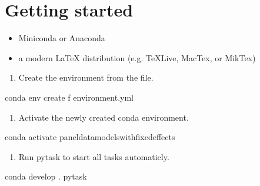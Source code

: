 \documentclass[a4paper,11pt,english]{sphinxmanual}
\begin{document}
\section{Getting started}
\label{\detokenize{introduction:getting-started}}\label{\detokenize{introduction:id3}}
\sphinxAtStartPar
{}
\begin{itemize}
\item {} 
\sphinxAtStartPar
Miniconda or Anaconda

\item {} 
\sphinxAtStartPar
a modern LaTeX distribution (e.g. TeXLive, MacTex, or MikTex)

\end{itemize}
\begin{enumerate}
%
\item {} 
\sphinxAtStartPar
Create the environment from the  file.

\end{enumerate}

\begin{sphinxVerbatim}[commandchars=\\\{\},numbers=left,firstnumber=1,stepnumber=1]
conda env create \PYGZhy{}f environment.yml
\end{sphinxVerbatim}
\begin{enumerate}
%
\setcounter{enumi}{1}
\item {} 
\sphinxAtStartPar
Activate the newly created conda environment.

\end{enumerate}

\begin{sphinxVerbatim}[commandchars=\\\{\},numbers=left,firstnumber=1,stepnumber=1]
conda activate panel\PYGZus{}data\PYGZus{}models\PYGZus{}with\PYGZus{}fixed\PYGZus{}effects
\end{sphinxVerbatim}
\begin{enumerate}
%
\setcounter{enumi}{2}
\item {} 
\sphinxAtStartPar
Run pytask to start all tasks automaticly.

\end{enumerate}

\begin{sphinxVerbatim}[commandchars=\\\{\},numbers=left,firstnumber=1,stepnumber=1]
conda develop .
pytask
\end{sphinxVerbatim}
\end{document}
